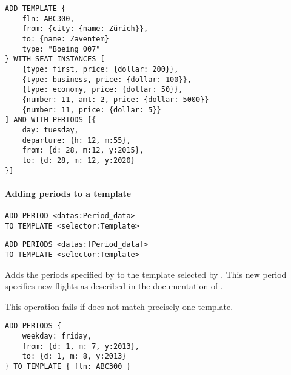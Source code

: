 \begin{texa}
  \begin{lstlisting}
ADD TEMPLATE {
    fln: ABC300,
    from: {city: {name: Zürich}},
    to: {name: Zaventem}
    type: "Boeing 007"
} WITH SEAT INSTANCES [
    {type: first, price: {dollar: 200}},
    {type: business, price: {dollar: 100}},
    {type: economy, price: {dollar: 50}},
    {number: 11, amt: 2, price: {dollar: 5000}}
    {number: 11, price: {dollar: 5}}
] AND WITH PERIODS [{
    day: tuesday,
    departure: {h: 12, m:55},
    from: {d: 28, m:12, y:2015},
    to: {d: 28, m: 12, y:2020}
}]
  \end{lstlisting}
\end{texa}

\paragraph{Adding periods to a template}
\begin{operation}
  \label{op:add_period}
  \begin{lstlisting}
ADD PERIOD <datas:Period_data>
TO TEMPLATE <selector:Template>
  \end{lstlisting}
\end{operation}
\begin{operation}
  \label{op:add_periods}
  \begin{lstlisting}
ADD PERIODS <datas:[Period_data]>
TO TEMPLATE <selector:Template>
  \end{lstlisting}
\end{operation}
Adds the periods specified by  to the template selected by
. This new period specifies new flights as described in the
documentation of .

This operation fails if  does not match precisely one template.

\begin{texa}
  \begin{lstlisting}
ADD PERIODS {
    weekday: friday,
    from: {d: 1, m: 7, y:2013},
    to: {d: 1, m: 8, y:2013}
} TO TEMPLATE { fln: ABC300 }
  \end{lstlisting}
\end{texa}


